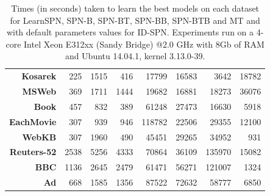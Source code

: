\documentclass[xcolor={usenames,dvipsnames,svgnames}, compress]{beamer}
\begin{document}
\begin{frame}
\begin{table}[htbp]
\begin{tabular}{r r r r r r r r}
      \textbf{Kosarek}    & 225               & 1515           & 416             & 17799           & 16583           & 3642             & 18782 \\ 
      \textbf{MSWeb}      & 369               & 1711           & 1444            & 19682           & 16881           & 18273            & 36076 \\ 
      \textbf{Book}       & 457               & 832            & 389             & 61248           & 27473           & 16630            & 5918  \\ 
      \textbf{EachMovie}  & 307               & 939            & 946             & 118782          & 22506           & 29355            & 12100 \\ 
      \textbf{WebKB}      & 307               & 1960           & 490             & 45451           & 29265           & 34952            & 931   \\ 
      \textbf{Reuters-52} & 2538              & 5256           & 4333            & 70864           & 36109           & 135970           & 15082 \\ 
      \textbf{BBC}        & 1136              & 2645           & 2479            & 61471           & 56271           & 121007           & 1324  \\ 
      \textbf{Ad}         & 668               & 1585           & 1356            & 87522           & 72632           & 58777            & 6850  \\ 
      \bottomrule
    \end{tabular}
    \caption[Experimental times]{Times (in seconds) taken to learn the best
      models on each dataset for \textsf{LearnSPN},
      \textsf{SPN-B}, \textsf{SPN-BT}, \textsf{SPN-BB}, \textsf{SPN-BTB}
      and \textsf{MT} and with default parameters values for
      \textsf{ID-SPN}. Experiments run on a 4-core Intel Xeon E312xx
      (Sandy Bridge) @2.0 GHz with 8Gb of
      RAM and Ubuntu 14.04.1, kernel 3.13.0-39.}
    \label{tab:times}
  \end{table}
\end{frame}
\end{document}
